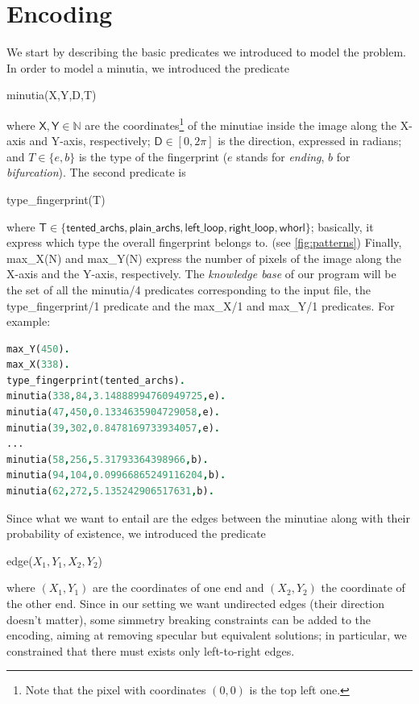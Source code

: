 \documentclass[8pt]{article}
\begin{document}
\section{Encoding}
\label{sec:encoding}
We start by describing the basic predicates we introduced to model
the problem. In order to model a minutia, we introduced the predicate
  \begin{center}
    \textsf{minutia(X,Y,D,T)}
  \end{center}
where $\textsf{X},\textsf{Y} \in \mathbb{N}$ are the coordinates\footnote{Note 
that the pixel with coordinates $(0,0)$ is the top left one.}
of the minutiae inside the image along the X-axis and Y-axis, respectively;
$\textsf{D} \in [0,2\pi]$ is the direction, expressed in radians; 
and $T \in \{e,b\}$ is the type of the fingerprint ($e$ stands for
\emph{ending}, $b$ for \emph{bifurcation}).
The second predicate is
  \begin{center}
    \textsf{type\_fingerprint(T)}
  \end{center}
where $\textsf{T}\in\{
  \textsf{tented\_archs},
  \textsf{plain\_archs},
  \textsf{left\_loop},
  \textsf{right\_loop},
  \textsf{whorl}
\}$; 
basically, it express which type the overall fingerprint belongs to.
(see \cref{fig:patterns})
Finally, \textsf{max\_X(N)} and \textsf{max\_Y(N)} express the number
of pixels of the image along the X-axis and the Y-axis, respectively.
The \emph{knowledge base} of our program will be the set of all the 
\textsf{minutia/4} predicates corresponding to the input file,
the \textsf{type\_fingerprint/1} predicate and the \textsf{max\_X/1}
and \textsf{max\_Y/1} predicates. For example:
  \begin{center}
  \begin{lstlisting}[language=Prolog,frame = single,basicstyle=\footnotesize\ttfamily]
max_Y(450).
max_X(338).
type_fingerprint(tented_archs).
minutia(338,84,3.14888994760949725,e).
minutia(47,450,0.1334635904729058,e).
minutia(39,302,0.8478169733934057,e).
...
minutia(58,256,5.31793364398966,b).
minutia(94,104,0.09966865249116204,b).
minutia(62,272,5.135242906517631,b).
  \end{lstlisting}
  \end{center}
Since what we want to entail are the edges between the minutiae along
with their probability of existence, we introduced the predicate
  \begin{center}
    \textsf{edge($X_1,Y_1,X_2,Y_2$)}
  \end{center}
where $(X_1,Y_1)$ are the coordinates of one end and $(X_2,Y_2)$
the coordinate of the other end.
Since in our setting we want undirected edges (their direction doesn't
matter), some simmetry breaking constraints can be added to the 
encoding, aiming at removing specular but equivalent solutions; in
particular, we constrained that there must exists only left-to-right
edges.
\end{document}

